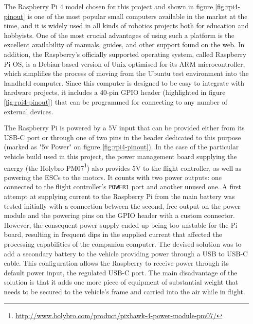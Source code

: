 The Raspberry Pi 4 model chosen for this project and shown in figure \ref{fig:rpi4-pinout} is one of the most popular small computers available in the market at the time, and it is widely used in all kinds of robotics projects both for education and hobbyists.
One of the most crucial advantages of using such a platform is the excellent availability of manuals, guides, and other support found on the web.
In addition, the Raspberry's officially supported operating system, called Raspberry Pi OS, is a Debian-based version of Unix optimised for its ARM microcontroller, which simplifies the process of moving from the Ubuntu test environment into the handheld computer.
Since this computer is designed to be easy to integrate with hardware projects, it includes a 40-pin GPIO header (highlighted in figure \ref{fig:rpi4-pinout}) that can be programmed for connecting to any number of external devices.

The Raspberry Pi is powered by a 5V input that can be provided either from its USB-C port or through one of two pins in the header dedicated to this purpose (marked as "5v Power" on figure \ref{fig:rpi4-pinout}).
In the case of the particular vehicle build used in this project, the power management board supplying the energy (the Holybro PM07\footnote{\url{http://www.holybro.com/product/pixhawk-4-power-module-pm07/}}) also provides 5V to the flight controller, as well as powering the ESCs to the motors.
It counts with two power outputs: one connected to the flight controller's \texttt{POWER1} port and another unused one.
A first attempt at supplying current to the Raspberry Pi from the main battery was tested initially with a connection between the second, free output on the power module and the powering pins on the GPIO header with a custom connector.
However, the consequent power supply ended up being too unstable for the Pi board, resulting in frequent dips in the supplied current that affected the processing capabilities of the companion computer.
The devised solution was to add a secondary battery to the vehicle providing power through a USB to USB-C cable.
This configuration allows the Raspberry to receive power through its default power input, the regulated USB-C port.
The main disadvantage of the solution is that it adds one more piece of equipment of substantial weight that needs to be secured to the vehicle's frame and carried into the air while in flight.

